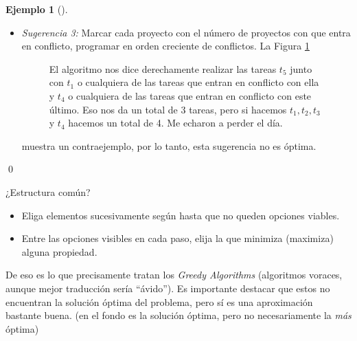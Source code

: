 \documentclass[english, spanish, fleqn, 10pt]{article}
\newcommand{\comillas}[1]{``#1''}
\numberwithin{equation}{section}
\theoremstyle{definition}
\newtheorem{beforeExample}{Ejemplo}[section]
\newenvironment{ejemplo}[1][]{\begin{beforeExample}[#1]\renewcommand{\qedsymbol}{$\blacksquare$}}{\qed\end{beforeExample}}
\begin{document}
\begin{ejemplo}
\begin{itemize}
	 \item \emph{Sugerencia 3:} Marcar cada proyecto con el número de proyectos con que entra en conflicto, programar en orden creciente de conflictos. La Figura \ref{07::Tareas4}
	 \begin{figure}[!h]
	 	\centering
	 	\newcommand{\lineaTarea}[3]{\draw (#1, 0.15+#2) -- (#1, -0.15+#2) -- (#1, #2) -- (#1+#3, #2) -- (#1+#3, 0.15+#2) -- (#1+#3, -0.15+#2)} %
	 	\caption{El algoritmo nos dice derechamente realizar las tareas $t_5$ junto con $t_1$ o cualquiera de las tareas que entran en conflicto con ella y $t_4$ o cualquiera de las tareas que entran en conflicto con este último. Eso nos da un total de $3$ tareas, pero si hacemos $t_1, t_2, t_3$ y $t_4$ hacemos un total de 4. Me echaron a perder el día.}
	 	\label{07::Tareas4}
	 \end{figure}
	 muestra un contraejemplo, por lo tanto, esta sugerencia no es óptima. 
	\end{itemize}
\end{ejemplo}

¿Estructura común?
\begin{itemize}
	\item Eliga elementos sucesivamente según hasta que no queden opciones viables.
	
	\item Entre las opciones visibles en cada paso, elija la que minimiza (maximiza) alguna propiedad.
\end{itemize}
De eso es lo que precisamente tratan los \emph{Greedy Algorithms} (algoritmos voraces, aunque mejor traducción sería \comillas{ávido}). Es importante destacar que estos no encuentran la solución óptima del problema, pero sí es una aproximación bastante buena. (en el fondo es la solución óptima, pero no necesariamente la \emph{más} óptima)
\end{document}
